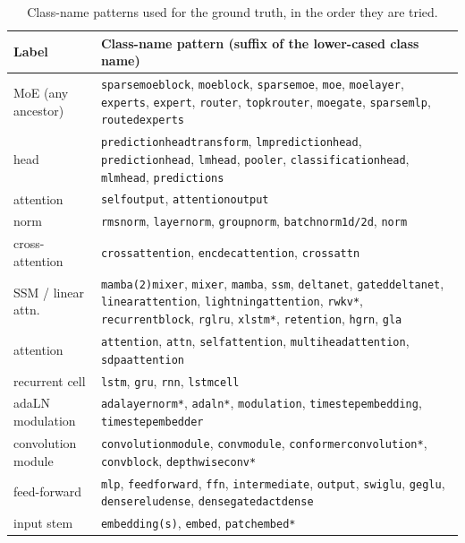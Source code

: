 \documentclass[11pt]{article}
\newcommand{\tn}[1]{\texttt{#1}}
\begin{document}
\begin{table}[h]
\centering
\footnotesize
\begin{tabular}{@{}lp{12.4cm}@{}}
\toprule
Label & Class-name pattern (suffix of the lower-cased class name) \\
\midrule
MoE (any ancestor) & \tn{sparsemoeblock}, \tn{moeblock}, \tn{sparsemoe}, \tn{moe}, \tn{moelayer}, \tn{experts}, \tn{expert}, \tn{router}, \tn{topkrouter}, \tn{moegate}, \tn{sparsemlp}, \tn{routedexperts} \\
head & \tn{predictionheadtransform}, \tn{lmpredictionhead}, \tn{predictionhead}, \tn{lmhead}, \tn{pooler}, \tn{classificationhead}, \tn{mlmhead}, \tn{predictions} \\
attention & \tn{selfoutput}, \tn{attentionoutput} \\
norm & \tn{rmsnorm}, \tn{layernorm}, \tn{groupnorm}, \tn{batchnorm1d/2d}, \tn{norm} \\
cross-attention & \tn{crossattention}, \tn{encdecattention}, \tn{crossattn} \\
SSM / linear attn. & \tn{mamba(2)mixer}, \tn{mixer}, \tn{mamba}, \tn{ssm}, \tn{deltanet}, \tn{gateddeltanet}, \tn{linearattention}, \tn{lightningattention}, \tn{rwkv*}, \tn{recurrentblock}, \tn{rglru}, \tn{xlstm*}, \tn{retention}, \tn{hgrn}, \tn{gla} \\
attention & \tn{attention}, \tn{attn}, \tn{selfattention}, \tn{multiheadattention}, \tn{sdpaattention} \\
recurrent cell & \tn{lstm}, \tn{gru}, \tn{rnn}, \tn{lstmcell} \\
adaLN modulation & \tn{adalayernorm*}, \tn{adaln*}, \tn{modulation}, \tn{timestepembedding}, \tn{timestepembedder} \\
convolution module & \tn{convolutionmodule}, \tn{convmodule}, \tn{conformerconvolution*}, \tn{convblock}, \tn{depthwiseconv*} \\
feed-forward & \tn{mlp}, \tn{feedforward}, \tn{ffn}, \tn{intermediate}, \tn{output}, \tn{swiglu}, \tn{geglu}, \tn{densereludense}, \tn{densegatedactdense} \\
input stem & \tn{embedding(s)}, \tn{embed}, \tn{patchembed*} \\
\bottomrule
\end{tabular}
\caption{Class-name patterns used for the ground truth, in the order they are tried.}
\label{tab:suffix}
\end{table}
\end{document}
